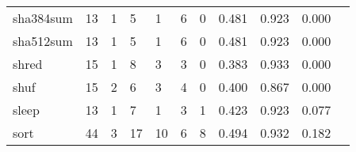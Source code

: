 \begin{longtable}{lp{1.2cm}p{1.2cm}p{1.2cm}p{1.2cm}p{1.2cm}p{1.2cm}p{1.2cm}p{1.2cm}p{1.2cm}p{1.2cm}}
sha384sum &                                    13 &                                                  1 &                                                  5 &                                                  1 &                                                  6 &                                                  0 &                                              0.481 &                                              0.923 &                                              0.000 \\
sha512sum &                                    13 &                                                  1 &                                                  5 &                                                  1 &                                                  6 &                                                  0 &                                              0.481 &                                              0.923 &                                              0.000 \\
shred     &                                    15 &                                                  1 &                                                  8 &                                                  3 &                                                  3 &                                                  0 &                                              0.383 &                                              0.933 &                                              0.000 \\
shuf      &                                    15 &                                                  2 &                                                  6 &                                                  3 &                                                  4 &                                                  0 &                                              0.400 &                                              0.867 &                                              0.000 \\
sleep     &                                    13 &                                                  1 &                                                  7 &                                                  1 &                                                  3 &                                                  1 &                                              0.423 &                                              0.923 &                                              0.077 \\
sort      &                                    44 &                                                  3 &                                                 17 &                                                 10 &                                                  6 &                                                  8 &                                              0.494 &                                              0.932 &                                              0.182 \\

\end{longtable}
